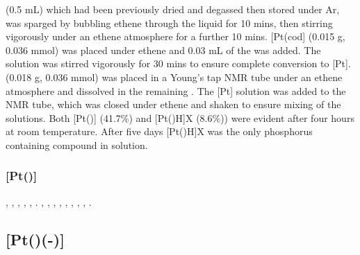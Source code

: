  (0.5 mL) which had been previously dried and degassed then stored under Ar, was sparged by bubbling ethene through the liquid for 10 mins, then stirring vigorously under an ethene atmosphere for a further 10 mins.  [Pt(cod] (0.015 g, 0.036 mmol) was placed under ethene and 0.03 mL of the  was added.  The solution was stirred vigorously for 30 mins to ensure complete conversion to [Pt].  \tBuXantphos(0.018 g, 0.036 mmol) was placed in a Young's tap NMR tube under an ethene atmosphere and dissolved in the remaining .  The [Pt] solution was added to the NMR tube, which was closed under ethene and shaken to ensure mixing of the solutions.  Both [Pt(\tBuxantphos)] (41.7\%) and [Pt(\tBuxantphos)H]X (8.6\%)) were evident after four hours at room temperature.  After five days [Pt(\tBuxantphos)H]X was the only phosphorus containing compound in solution.

\subsubsection*{[Pt(\tBuxantphos)]}

\begin{sloppypar}
,
,
,
,
,
.
,
,
,
,
,
,
,
,
.
\end{sloppypar}

\subsection*{\texorpdfstring{[Pt(\tButhixantphos)(-)]} P}


